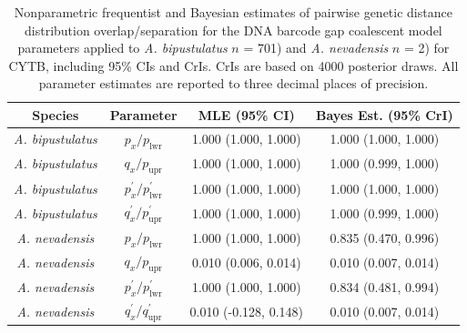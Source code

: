 \documentclass[12pt]{article}
\begin{document}
\begin{table}[H]

\centering

\caption{Nonparametric frequentist and Bayesian estimates of pairwise genetic distance distribution overlap/separation for the DNA barcode gap coalescent model parameters applied to \textit{A. bipustulatus} $n$ = 701) and \textit{A. nevadensis} $n$ = 2) for CYTB, including 95\%  CIs and CrIs. CrIs are based on 4000 posterior draws. All parameter estimates are reported to three decimal places of precision.}

\begin{tabular}{cccc} \hline

\textbf{Species} & \textbf{Parameter} & \textbf{MLE (95\% CI)} & \textbf{Bayes Est. (95\% CrI)} \\  \hline
\textit{A. bipustulatus} & $p_x/p_\mathrm{lwr}$ & 1.000 (1.000, 1.000) & 1.000 (1.000, 1.000) \\
\textit{A. bipustulatus} & $q_x/p_\mathrm{upr}$ & 1.000 (1.000, 1.000) & 1.000 (0.999, 1.000) \\
\textit{A. bipustulatus} & $p^{'}_x/p^{'}_\mathrm{lwr}$ & 1.000 (1.000, 1.000) & 1.000 (1.000, 1.000)  \\
\textit{A. bipustulatus} & $q^{'}_x/p^{'}_\mathrm{upr}$ & 1.000 (1.000, 1.000) & 1.000 (0.999, 1.000) \\
\textit{A. nevadensis} & $p_x/p_\mathrm{lwr}$ & 1.000 (1.000, 1.000) & 0.835 (0.470, 0.996) \\
\textit{A. nevadensis} & $q_x/p_\mathrm{upr}$ & 0.010 (0.006, 0.014) & 0.010 (0.007, 0.014) \\
\textit{A. nevadensis} &  $p^{'}_x/p^{'}_\mathrm{lwr}$ & 1.000 (1.000, 1.000) & 0.834 (0.481, 0.994) \\
\textit{A. nevadensis} &  $q^{'}_x/q^{'}_\mathrm{upr}$ & 0.010 (-0.128, 0.148) & 0.010 (0.007, 0.014) \\
\hline

\end{tabular}

\end{table}
\end{document}
